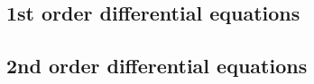 \documentclass{article}
\begin{document}
\begin{multicols*}{2}
\subsection{1st order differential equations}

\subsection{2nd order differential equations}

\subsection{}

\end{multicols*}
\end{document}
